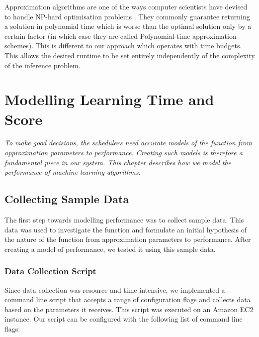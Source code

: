 \documentclass[a4paper,12pt,twoside,openright]{report}
\begin{document}
Approximation algorithms are one of the ways computer scientists have devised to handle NP-hard optimisation problems \cite{Vazirani:2001:AA:500776}. They commonly guarantee returning a solution in polynomial time which is worse than the optimal solution only by a certain factor (in which case they are called Polynomial-time approximation schemes). This is different to our approach which operates with time budgets. This allows the desired runtime to be set entirely independently of the complexity of the inference problem.



\chapter{Modelling Learning Time and Score}
\label{ch:modelling}
\textit{To make good decisions, the schedulers need accurate models of the function from approximation parameters to performance. Creating such models is therefore a fundamental piece in our system. This chapter describes how we model the performance of machine learning algorithms.}

\section{Collecting Sample Data}
The first step towards modelling performance was to collect sample data. This data was used to investigate the function and formulate an initial hypothesis of the nature of the function from approximation parameters to performance. After creating a model of performance, we tested it using this sample data. 

\subsection{Data Collection Script}
Since data collection was resource and time intensive, we implemented a command line script that accepts a range of configuration flags and collects data based on the parameters it receives. This script was executed on an Amazon EC2 instance. Our script can be configured with the following list of command line flags:
\end{document}
